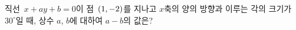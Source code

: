 직선~$x+ay+b=0$이 점~$(1{,}\mkern3mu\mathopen{}-2)$를 지나고 $x$축의 양의 방향과 이루는 각의 크기가 $30^\circ$일 때, 상수 $a$, $b$에 대하여 $a-b$의 값은?
